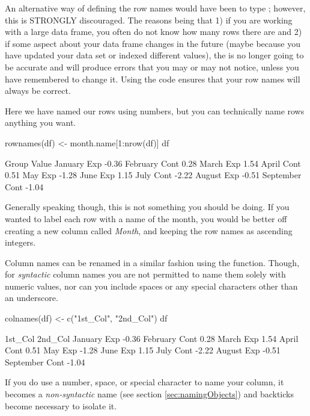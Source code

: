 An alternative way of defining the row names would have been to type ; however, this is STRONGLY discouraged.  The reasons being that 1) if you are working with a large data frame, you often do not know how many rows there are and 2) if some aspect about your data frame changes in the future (maybe because you have updated your data set or indexed different values), the  is no longer going to be accurate and will produce errors that you may or may not notice, unless you have remembered to change it. Using the code  ensures that your row names will always be correct.

Here we have named our rows using numbers, but you can technically name rows anything you want.
\begin{inR}
rownames(df) <- month.name[1:nrow(df)]
df
\end{inR}
\begin{outR}
          Group Value
January     Exp -0.36
February   Cont  0.28
March       Exp  1.54
April      Cont  0.51
May         Exp -1.28
June        Exp  1.15
July       Cont -2.22
August      Exp -0.51
September  Cont -1.04
\end{outR}

Generally speaking though, this is not something you should be doing.  If you wanted to label each row with a name of the month, you would be better off creating a new column called \textit{Month}, and keeping the row names as ascending integers.

Column names can be renamed in a similar fashion using the  function. Though, for \textit{syntactic} column names you are not permitted to name them solely with numeric values, nor can you include spaces or any special characters other than an underscore.

\begin{inR}
colnames(df) <- c("1st_Col", "2nd_Col")
df
\end{inR}
\begin{outR}
          1st_Col 2nd_Col
January       Exp   -0.36
February     Cont    0.28
March         Exp    1.54
April        Cont    0.51
May           Exp   -1.28
June          Exp    1.15
July         Cont   -2.22
August        Exp   -0.51
September    Cont   -1.04
\end{outR}

If you do use a number, space, or special character to name your column, it becomes a \textit{non-syntactic} name (see section \ref{sec:namingObjects}) and backticks become necessary to isolate it. 

